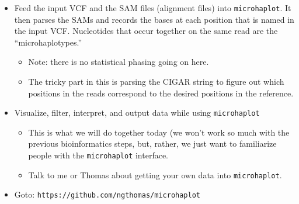 \documentclass[letter,graphicx]{beamer}
\begin{document}
\begin{frame}{}
\begin{itemize}
\item Feed the input VCF and the SAM files (alignment files) into {\tt microhaplot}.  It then parses the SAMs and records the bases at each position that is named in the input VCF.  Nucleotides that occur together
on the same read are the ``microhaplotypes.'' 
\begin{itemize}
 \item Note: there is no statistical phasing going on here.
 \item The tricky part in this is parsing the CIGAR string to figure out which positions in the reads
 correspond to the desired positions in the reference.
\end{itemize}

\item Visualize, filter, interpret, and output data while using {\tt microhaplot}
\begin{itemize}
\item This is what we will do together today (we won't work so much with the previous bioinformatics steps,
but, rather, we just want to familiarize people with the {\tt microhaplot} interface.  
\item Talk to me or Thomas about getting your own data into {\tt microhaplot}.
\end{itemize}

\item Goto: {\tt https://github.com/ngthomas/microhaplot}

\end{itemize}


\end{frame}
\end{document}
